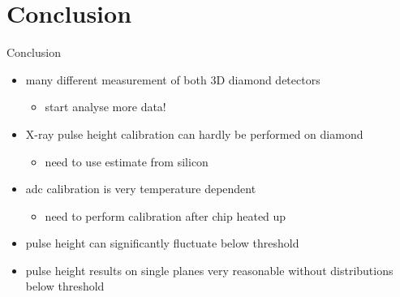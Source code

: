 \section{Conclusion}
\begin{frame}{Conclusion}

	\begin{minipage}[c][4cm]{\textwidth}
		\begin{itemize}
			\itemfill
			\item many different measurement of both 3D diamond detectors
			\begin{itemize}
				\item start analyse more data!\vspace*{2ex}
			\end{itemize}
			\item X-ray pulse height calibration can hardly be performed on diamond
			\begin{itemize}
				\item need to use estimate from silicon\vspace*{2ex}
			\end{itemize}
			\item adc calibration is very temperature dependent 
			\begin{itemize}
				\item need to perform calibration after chip heated up
			\end{itemize}
			\item pulse height can significantly fluctuate below threshold                    
			\item pulse height results on single planes very reasonable without distributions below threshold
		\end{itemize}
	\end{minipage}
	
\end{frame}

